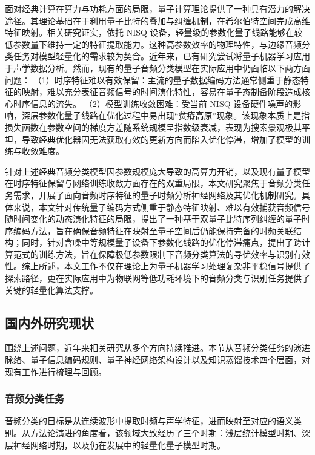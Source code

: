 面对经典计算在算力与功耗方面的局限，量子计算理论提供了一种具有潜力的解决途径。其理论基础在于利用量子比特的叠加与纠缠机制，在希尔伯特空间完成高维特征映射。相关研究证实，依托 NISQ 设备，轻量级的参数化量子线路能够在较低参数量下维持一定的特征提取能力。这种高参数效率的物理特性，与边缘音频分类任务对模型轻量化的需求较为契合。近年来，已有研究尝试将量子机器学习应用于声学数据分析。然而，现有的量子音频分类模型在实际应用中仍面临以下两方面问题：
（1）时序特征难以有效保留：主流的量子数据编码方法通常侧重于静态特征的映射，难以充分表征音频信号的时间演化特性，容易在量子态制备阶段造成核心时序信息的流失。
（2）模型训练收敛困难：受当前 NISQ 设备硬件噪声的影响，深层参数化量子线路在优化过程中易出现“贫瘠高原”现象。该现象本质上是指损失函数在参数空间的梯度方差随系统规模呈指数级衰减，表现为搜索景观极其平坦，导致经典优化器因无法获取有效的更新方向而陷入优化停滞，增加了模型的训练与收敛难度。

针对上述经典音频分类模型因参数规模庞大导致的高算力开销，以及现有量子模型在时序特征保留与网络训练收敛方面存在的双重局限，本文研究聚焦于音频分类任务需求，开展了面向音频时序特征的量子时频分析神经网络及其优化机制研究。具体来说，本文针对传统量子编码方式侧重于静态特征映射、难以有效捕获音频信号随时间变化的动态演化特征的局限，提出了一种基于双量子比特序列纠缠的量子时序编码方法，旨在确保音频特征在映射至量子空间后仍能保持完备的时频关联结构；同时，针对含噪中等规模量子设备下参数化线路的优化停滞痛点，提出了跨计算范式的训练方法，旨在保障极低参数限制下音频分类算法的寻优效率与识别有效性。综上所述，本文工作不仅在理论上为量子机器学习处理复杂非平稳信号提供了探索路径，更在实际应用中为物联网等低功耗环境下的音频分类与识别任务提供了关键的轻量化算法支撑。

\subsection{国内外研究现状}
围绕上述问题，近年来相关研究从多个方向持续推进。本节从音频分类任务的演进脉络、量子信息编码规则、量子神经网络架构设计以及知识蒸馏技术四个层面，对现有工作进行梳理与回顾。

\subsubsection{音频分类任务}

音频分类的目标是从连续波形中提取时频与声学特征，进而映射至对应的语义类别。从方法论演进的角度看，该领域大致经历了三个时期：浅层统计模型时期、深层神经网络时期，以及仍在发展中的轻量化量子模型时期。

